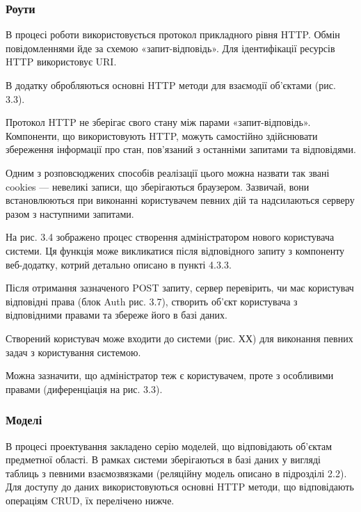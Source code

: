 
\subsubsection{Роути}
В процесі роботи використовується протокол прикладного рівня HTTP. Обмін повідомленнями йде за схемою «запит-відповідь». Для ідентифікації ресурсів HTTP використовує URI. 

В додатку обробляються основні  HTTP методи для взаємодії об’єктами (рис. 3.3). 


Протокол HTTP не зберігає свого стану між парами «запит-відповідь». Компоненти, що використовують HTTP, можуть самостійно здійснювати збереження інформації про стан, пов'язаний з останніми запитами та відповідями. 

Одним з розповсюджених способів реалізації цього можна назвати так звані cookies — невеликі записи, що зберігаються браузером. Зазвичай, вони встановлюються при виконанні користувачем певних дій та надсилаються серверу разом з наступними запитами. 

На рис. 3.4 зображено процес створення адміністратором нового користувача системи. Ця функція може викликатися після відповідного запиту з компоненту веб-додатку, котрий детально описано в пункті 4.3.3.

Після отримання зазначеного POST запиту, сервер перевірить, чи має користувач відповідні права (блок Auth рис. 3.7), створить об’єкт користувача з відповідними правами та збереже його в базі даних.

Створений користувач може входити до системи (рис. ХХ) для виконання певних задач з користування системою.

Можна зазначити, що адміністратор теж є користувачем, проте з особливими правами (диференціація на рис. 3.3).


\subsubsection{Моделі}
В процесі проектування закладено серію моделей, що відповідають об’єктам предметної області. В рамках системи зберігаються в базі даних у вигляді таблиць з певними взаємозвязками (реляційну модель описано в підрозділі 2.2). Для доступу до даних використовуються основні HTTP методи, що відповідають операціям CRUD, їх перелічено нижче.

\clearpage
